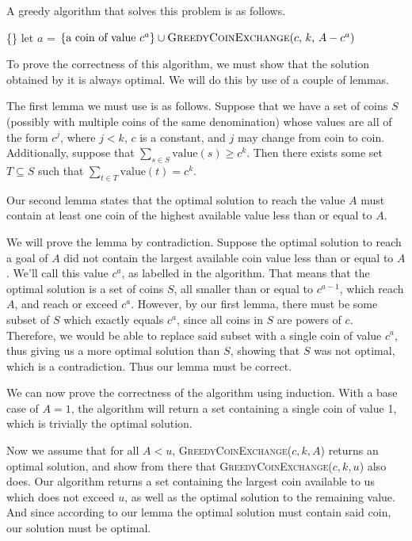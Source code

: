 \documentclass{article}
\begin{document}
A greedy algorithm that solves this problem is as follows.

\begin{algorithm}
	\begin{algorithmic}
		\Return \{\}
		\EndIf
		\State let \(a\) = 
		\State \Return \(\{\text{a coin of value } c^a\} \cup \text{\Call{GreedyCoinExchange}{$c$, $k$, $A - c^a$}}\)
		\EndFunction
	\end{algorithmic}
\end{algorithm}

To prove the correctness of this algorithm, we must show that the solution obtained by it is always optimal. We will do this by use of a couple of lemmas.

The first lemma we must use is as follows. Suppose that we have a set of coins \(S\) (possibly with multiple coins of the same denomination) whose values are all of the form \(c^j\), where \(j<k\), \(c\) is a constant, and \(j\) may change from coin to coin. Additionally, suppose that \(\sum_{s \in S}\text{value}(s) \geq c^k\). Then there exists some set \(T \subseteq S\) such that \(\sum_{t \in T}\text{value}(t) = c^k\).

Our second lemma states that the optimal solution to reach the value \(A\) must contain at least one coin of the highest available value less than or equal to \(A\).

We will prove the lemma by contradiction. Suppose the optimal solution to reach a goal of \(A\) did not contain the largest available coin value less than or equal to \(A\). We'll call this value \(c^a\), as labelled in the algorithm. That means that the optimal solution is a set of coins \(S\), all smaller than or equal to \(c^{a-1}\), which reach \(A\), and reach or exceed \(c^a\). However, by our first lemma, there must be some subset of \(S\) which exactly equals \(c^a\), since all coins in \(S\) are powers of \(c\). Therefore, we would be able to replace said subset with a single coin of value \(c^a\), thus giving us a more optimal solution than \(S\), showing that \(S\) was not optimal, which is a contradiction. Thus our lemma must be correct.

We can now prove the correctness of the algorithm using induction. With a base case of \(A=1\), the algorithm will return a set containing a single coin of value 1, which is trivially the optimal solution.

Now we assume that for all \(A < u\), \textsc{GreedyCoinExchange}(\(c, k, A\)) returns an optimal solution, and show from there that \textsc{GreedyCoinExchange}(\(c, k, u\)) also does. Our algorithm returns a set containing the largest coin available to us which does not exceed \(u\), as well as the optimal solution to the remaining value. And since according to our lemma the optimal solution must contain said coin, our solution must be optimal.
\end{document}
